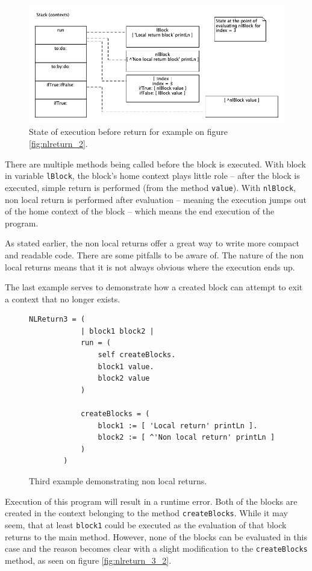 \documentclass[thesis=M,english]{FITthesis}[2019/12/23]
\begin{document}
\begin{figure}[h!]
	\centering
	\includegraphics[width=\linewidth]{media/nlreturn_ex2.png}
	\caption{State of execution before return for example on figure \ref{fig:nlreturn_2}.}
	\label{fig:nlreturn_2_ctx}
\end{figure}

There are multiple methods being called before the block is executed. With block in variable \texttt{lBlock}, the
block's home context plays little role -- after the block is executed, simple return is performed (from the method
\texttt{value}). With \texttt{nlBlock}, non local return is performed after evaluation -- meaning the execution jumps
out of the home context of the block -- which means the end execution of the program.

As stated earlier, the non local returns offer a great way to write more compact and readable code. There are some
pitfalls to be aware of. The nature of the non local returns means that it is not always obvious where the execution
ends up.

The last example serves to demonstrate how a created block can attempt to exit a context that no longer exists.

\begin{figure}[h!]
	\centering
	\begin{lstlisting}[language=Smalltalk]
		NLReturn3 = (
			| block1 block2 |
			run = (
				self createBlocks.
				block1 value.
				block2 value
			)

			createBlocks = (
				block1 := [ 'Local return' printLn ].
				block2 := [ ^'Non local return' printLn ]
			)
		)
	\end{lstlisting}
	\caption{Third example demonstrating non local returns.}
	\label{fig:nlreturn_3}
\end{figure}

Execution of this program will result in a runtime error. Both of the blocks are created in the context belonging to the method
\texttt{createBlocks}. While it may seem, that at least \texttt{block1} could be executed as the evaluation of that block
returns to the main method. However, none of the blocks can be evaluated in this case and the reason becomes clear with a 
slight modification to the \texttt{createBlocks} method, as seen on figure \ref{fig:nlreturn_3_2}.
\end{document}
